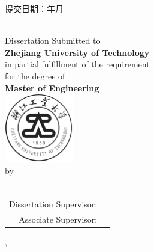 {\begin{center}
        
        \vspace*{\fill}
        {提交日期： 年 月}\\
        \vspace*{\fill}
        \end{center}


        \clearpage%
        \thispagestyle{empty}
        \begin{center}
               \\

            \vspace*{0.5cm}
            Dissertation Submitted to\\
            \textbf{Zhejiang University of Technology}\\
            in partial fulfillment of the requirement\\
            for the degree of\\
            \textbf{Master of Engineering}\\
            \includegraphics[width=3cm]{logo/zjutlogo}\\
            by\\
            \fillAuthorEn\\
            \vspace*{\fill}
            
            \setlength{\tabcolsep}{0.2cm}
            \begin{tabular}{rl}
              Dissertation Supervisor:&\space{}\\
              Associate Supervisor:&\space{}\\
            \end{tabular}
            
            \vspace*{\fill}
            , \\
            \vspace*{\fill}
        \end{center}
        \clearpage%
        \thispagestyle{empty}
        
}


